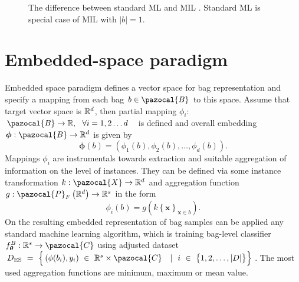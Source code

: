 \begin{figure}[h]
	\centering
	\caption{The difference between standard ML and MIL \cite{mandlik}. Standard ML is special case of MIL with $\vert b \vert = 1$. }%
	\label{ggm}%
\end{figure}
\section{Embedded-space paradigm}
Embedded space paradigm \cite{mandlik} defines a vector space for bag representation and specify a mapping from each bag $b\in \pazocal{B}$ to this space. Assume that target vector space is $\mathbb{R}^d$, then partial mapping $\phi_i$: $\pazocal{B} \to \R,~~\forall i=1,2\dots d$~~is defined and overall embedding $\boldsymbol{\phi}: \pazocal{B} \to \R^d $ is given by
\begin{equation}
	\boldsymbol{\phi}(b) = \left(\phi_1(b), \phi_2(b), \dots, \phi_d(b)\right).
\end{equation}
Mappings $\phi_i$ are instrumentals towards extraction and suitable aggregation of information on the level of instances. They can be defined via some instance transformation $k:\pazocal{X}\to \R^d$ and aggregation function $g:\pazocal{P}_F\left(\R^d\right) \to \R^s$ in the form 
\begin{equation}
	\phi_i(b)=g\left( k\left\lbrace\boldsymbol{x}\right\rbrace_{\boldsymbol{x} \in b}\right).
\end{equation}
On the resulting embedded representation of bag samples can be applied any standard machine learning algorithm, which is training bag-level classifier $f_{\boldsymbol{\theta}}^B :\R^s \to \pazocal{C}$ using adjusted dataset $D_{\mathrm{ES}}~=~\Big\lbrace \left(\phi(b_i), y_i\right)~\in~\R^s\times\pazocal{C}~\ ~|~\ i~\in~\big\lbrace 1,2,\dots,\vert D\vert\big\rbrace\Big\rbrace$. The most used aggregation functions are minimum, maximum or mean value.
